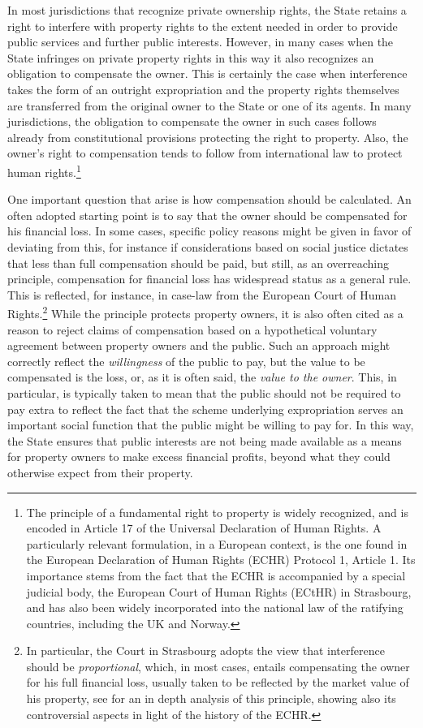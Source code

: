 In most jurisdictions that recognize private ownership rights, the State retains a right to interfere with property rights to the extent needed in order to provide public services and further public interests. However, in many cases when the State infringes on private property rights in this way it also recognizes an obligation to compensate the owner. This is certainly the case when interference takes the form of an outright expropriation and the property rights themselves are transferred from the original owner to the State or one of its agents. In many jurisdictions, the obligation to compensate the owner in such cases follows already from constitutional provisions protecting the right to property. Also, the owner's right to compensation tends to follow from international law to protect human rights.\footnote{The principle of a fundamental right to property is widely recognized, and is encoded in Article 17 of the Universal Declaration of Human Rights. A particularly relevant formulation, in a European context, is the one found in the European Declaration of Human Rights (ECHR) Protocol 1, Article 1. Its importance stems from the fact that the ECHR is accompanied by a special judicial body, the European Court of Human Rights (ECtHR) in Strasbourg, and has also been widely incorporated into the national law of the ratifying countries, including the UK and Norway.} 

One important question that arise is how compensation should be calculated. An often adopted starting point is to say that the owner should be compensated for his financial loss. In some cases, specific policy reasons might be given in favor of deviating from this, for instance if considerations based on social justice dictates that less than full compensation should be paid, but still, as an overreaching principle, compensation for financial loss has widespread status as a general rule. This is reflected, for instance, in case-law from the European Court of Human Rights.\footnote{In particular, the Court in Strasbourg adopts the view that interference should be \emph{proportional}, which, in most cases, entails compensating the owner for his full financial loss, usually taken to be reflected by the market value of his property, see \cite{AllenCom} for an in depth analysis of this principle, showing also its controversial aspects in light of the history of the ECHR.} While the principle protects property owners, it is also often cited as a reason to reject claims of compensation based on a hypothetical voluntary agreement between property owners and the public. Such an approach might correctly reflect the \emph{willingness} of the public to pay, but the value to be compensated is the loss, or, as it is often said, the \emph{value to the owner}. This, in particular, is typically taken to mean that the public should not be required to pay extra to reflect the fact that the scheme underlying expropriation serves an important social function that the public might be willing to pay for. In this way, the State ensures that public interests are not being made available as a means for property owners to make excess financial profits, beyond what they could otherwise expect from their property.

